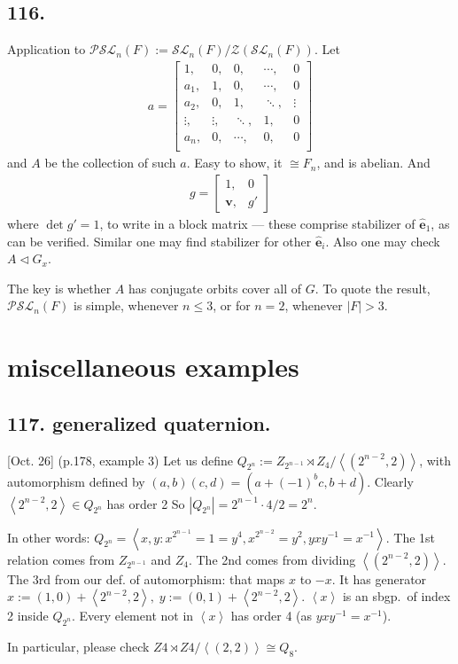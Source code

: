 \documentclass[12pt]{article}
\newcommand\M\cdot%
\newcommand\V\boldsymbol%
\newcommand{\Ab}[1]{ \left\langle #1 \right\rangle } %
\newcommand{\CF}[1]{ \mathcal{#1} }%
\newcommand{\SF}[1]{ \mathscr{#1} }%
\begin{document}
\subsection*{116.} Application to \(\CF{PSL}_n(F) := \CF{SL}_n(F) / \SF{Z}(\CF{SL}_n(F))\). 
Let \begin{gather}
 a= \begin{bmatrix}
  1, &0, &0, &\cdots, &0 \\
  a_1, &1, &0, &\cdots, &0 \\
  a_2, &0, &1, &\ddots, &\vdots \\
  \vdots, &\vdots, &\ddots, &1, &0 \\
  a_n, &0, &\cdots, &0, &0 \\
 \end{bmatrix}
\end{gather} and \(A\) be the collection of such \(a\). 
Easy to show, it \(\cong F_n\), and is abelian. 
And \begin{gather}
 g= \begin{bmatrix}
  1, &0 \\
  \V{v}, &g'
 \end{bmatrix}
\end{gather} where \(\det{g'}=1\), to write in a block matrix --- these comprise stabilizer of \(\hat{\V{e}}_1\), as can be verified. 
Similar one may find stabilizer for other \(\hat{\V{e}}_i\). 
Also one may check \(A \lhd G_x\). \par
The key is whether \(A\) has conjugate orbits cover all of \(G\). 
To quote the result, \(\CF{PSL}_n(F)\) is simple, whenever \(n \leq 3\), or for \(n=2\), whenever \(|F| >3\). 

\section{miscellaneous examples}
\subsection*{117. generalized quaternion.} [Oct. 26] (p.178, example 3) Let us define \(Q_{2^n} := Z_{2^{n-1}} \rtimes Z_4 / \Ab{(2^{n-2},2)}\), with automorphism defined by \((a,b)(c,d) = (a+(-1)^b c, b+d)\). 
Clearly \(\Ab{2^{n-2},2} \in Q_{2^n}\) has order 2  
So \(|Q_{2^n}| = 2^{n-1} \M 4 /2 = 2^n\). \par
In other words: \(Q_{2^n} = \Ab{ x,y: x^{2^{n-1}} =1 =y^4, x^{2^{n-2}} =y^2, yxy^{-1} =x^{-1} }\). 
The 1st relation comes from \(Z_{2^{n-1}}\) and \(Z_4\). 
The 2nd comes from dividing \(\Ab{(2^{n-2},2)}\). 
The 3rd from our def. of automorphism: that maps \(x\) to \(-x\). 
It has generator \(x := (1,0) + \Ab{2^{n-2},2},\; y := (0,1) + \Ab{2^{n-2},2}\). 
\(\Ab{x}\) is an sbgp.\ of index 2 inside \(Q_{2^n}\). 
Every element not in \(\Ab{x}\) has order 4 (as \(yxy^{-1} =x^{-1}\)). \par
In particular, please check \(Z4 \rtimes Z4 /\Ab{(2,2)} \cong Q_8\). 
\end{document}
